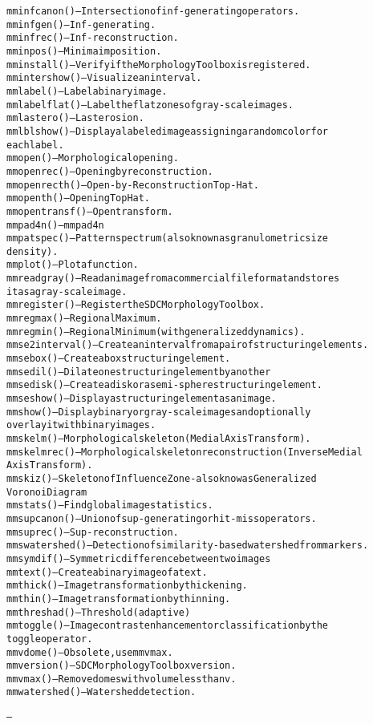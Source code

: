 \begin{alltt}
mminfcanon()     -- Intersection of inf-generating operators.
mminfgen()       -- Inf-generating.
mminfrec()       -- Inf-reconstruction.
mminpos()        -- Minima imposition.
mminstall()      -- Verify if the Morphology Toolbox is registered.
mmintershow()    -- Visualize an interval.
mmlabel()        -- Label a binary image.
mmlabelflat()    -- Label the flat zones of gray-scale images.
mmlastero()      -- Last erosion.
mmlblshow()      -- Display a labeled image assigning a random color for
                    each label.
mmopen()         -- Morphological opening.
mmopenrec()      -- Opening by reconstruction.
mmopenrecth()    -- Open-by-Reconstruction Top-Hat.
mmopenth()       -- Opening Top Hat.
mmopentransf()   -- Open transform.
mmpad4n()        -- mmpad4n
mmpatspec()      -- Pattern spectrum (also known as granulometric size
                    density).
mmplot()         -- Plot a function.
mmreadgray()     -- Read an image from a commercial file format and stores
                    it as a gray-scale image.
mmregister()     -- Register the SDC Morphology Toolbox.
mmregmax()       -- Regional Maximum.
mmregmin()       -- Regional Minimum (with generalized dynamics).
mmse2interval()  -- Create an interval from a pair of structuring elements.
mmsebox()        -- Create a box structuring element.
mmsedil()        -- Dilate one structuring element by another
mmsedisk()       -- Create a disk or a semi-sphere structuring element.
mmseshow()       -- Display a structuring element as an image.
mmshow()         -- Display binary or gray-scale images and optionally
                    overlay it with binary images.
mmskelm()        -- Morphological skeleton (Medial Axis Transform).
mmskelmrec()     -- Morphological skeleton reconstruction (Inverse Medial
                    Axis Transform).
mmskiz()         -- Skeleton of Influence Zone - also know as Generalized
                    Voronoi Diagram
mmstats()        -- Find global image statistics.
mmsupcanon()     -- Union of sup-generating or hit-miss operators.
mmsuprec()       -- Sup-reconstruction.
mmswatershed()   -- Detection of similarity-based watershed from markers.
mmsymdif()       -- Symmetric difference between two images
mmtext()         -- Create a binary image of a text.
mmthick()        -- Image transformation by thickening.
mmthin()         -- Image transformation by thinning.
mmthreshad()     -- Threshold (adaptive)
mmtoggle()       -- Image contrast enhancement or classification by the
                    toggle operator.
mmvdome()        -- Obsolete, use mmvmax.
mmversion()      -- SDC Morphology Toolbox version.
mmvmax()         -- Remove domes with volume less than v.
mmwatershed()    -- Watershed detection.

---\end{alltt}


